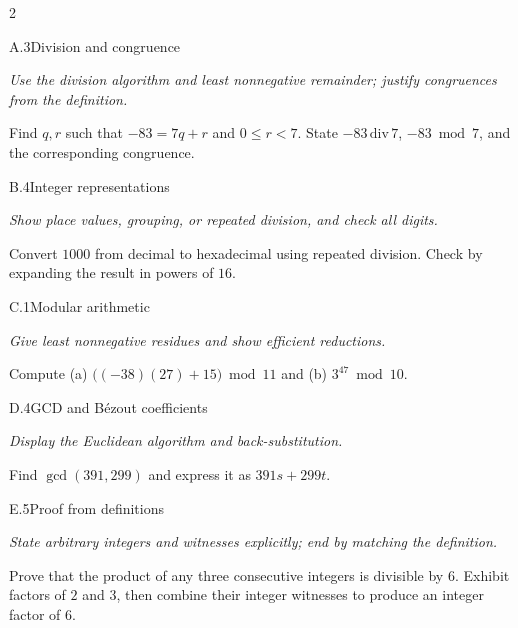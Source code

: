 \documentclass[9pt]{extarticle}
\begin{document}
\begin{multicols}{2}
\begin{CoreProblem}{A.3}{Division and congruence}
{\scriptsize\textit{Use the division algorithm and least nonnegative remainder; justify congruences from the definition.}\par}
Find $q,r$ such that $-83=7q+r$ and $0\le r<7$. State
$-83\,\mathrm{div}\,7$, $-83\bmod7$, and the corresponding congruence.
\end{CoreProblem}
\begin{CoreProblem}{B.4}{Integer representations}
{\scriptsize\textit{Show place values, grouping, or repeated division, and check all digits.}\par}
Convert $1000$ from decimal to hexadecimal using repeated division. Check by
expanding the result in powers of $16$.
\end{CoreProblem}
\begin{CoreProblem}{C.1}{Modular arithmetic}
{\scriptsize\textit{Give least nonnegative residues and show efficient reductions.}\par}
Compute (a) $\bigl((-38)(27)+15\bigr)\bmod11$ and
(b) $3^{47}\bmod10$.
\end{CoreProblem}
\columnbreak
\begin{CoreProblem}{D.4}{GCD and B\'ezout coefficients}
{\scriptsize\textit{Display the Euclidean algorithm and back-substitution.}\par}
Find $\gcd(391,299)$ and express it as $391s+299t$.
\end{CoreProblem}
\begin{CoreProblem}{E.5}{Proof from definitions}
{\scriptsize\textit{State arbitrary integers and witnesses explicitly; end by matching the definition.}\par}
Prove that the product of any three consecutive integers is divisible by $6$.
Exhibit factors of $2$ and $3$, then combine their integer witnesses to
produce an integer factor of $6$.
\end{CoreProblem}
\end{multicols}
\CoreWorkArea
\end{document}
